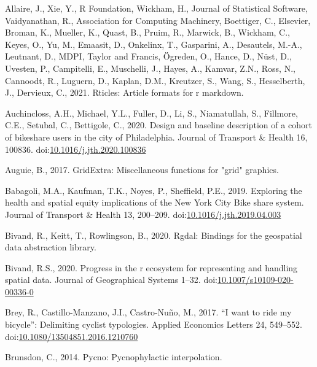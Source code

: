 \documentclass[]{elsarticle} %
\begin{document}
\hypertarget{refs}{}
\leavevmode\hypertarget{ref-R-rticles}{}%
Allaire, J., Xie, Y., R Foundation, Wickham, H., Journal of Statistical
Software, Vaidyanathan, R., Association for Computing Machinery,
Boettiger, C., Elsevier, Broman, K., Mueller, K., Quast, B., Pruim, R.,
Marwick, B., Wickham, C., Keyes, O., Yu, M., Emaasit, D., Onkelinx, T.,
Gasparini, A., Desautels, M.-A., Leutnant, D., MDPI, Taylor and Francis,
Ögreden, O., Hance, D., Nüst, D., Uvesten, P., Campitelli, E.,
Muschelli, J., Hayes, A., Kamvar, Z.N., Ross, N., Cannoodt, R., Luguern,
D., Kaplan, D.M., Kreutzer, S., Wang, S., Hesselberth, J., Dervieux, C.,
2021. Rticles: Article formats for r markdown.

\leavevmode\hypertarget{ref-auchinclossDesignBaselineDescription2020}{}%
Auchincloss, A.H., Michael, Y.L., Fuller, D., Li, S., Niamatullah, S.,
Fillmore, C.E., Setubal, C., Bettigole, C., 2020. Design and baseline
description of a cohort of bikeshare users in the city of Philadelphia.
Journal of Transport \& Health 16, 100836.
doi:\href{https://doi.org/10.1016/j.jth.2020.100836}{10.1016/j.jth.2020.100836}

\leavevmode\hypertarget{ref-R-gridExtra}{}%
Auguie, B., 2017. GridExtra: Miscellaneous functions for "grid"
graphics.

\leavevmode\hypertarget{ref-babagoliExploringHealthSpatial2019}{}%
Babagoli, M.A., Kaufman, T.K., Noyes, P., Sheffield, P.E., 2019.
Exploring the health and spatial equity implications of the New York
City Bike share system. Journal of Transport \& Health 13, 200--209.
doi:\href{https://doi.org/10.1016/j.jth.2019.04.003}{10.1016/j.jth.2019.04.003}

\leavevmode\hypertarget{ref-R-rgdal}{}%
Bivand, R., Keitt, T., Rowlingson, B., 2020. Rgdal: Bindings for the
geospatial data abstraction library.

\leavevmode\hypertarget{ref-bivand2020progress}{}%
Bivand, R.S., 2020. Progress in the r ecosystem for representing and
handling spatial data. Journal of Geographical Systems 1--32.
doi:\href{https://doi.org/10.1007/s10109-020-00336-0}{10.1007/s10109-020-00336-0}

\leavevmode\hypertarget{ref-breyWantRideMy2017}{}%
Brey, R., Castillo-Manzano, J.I., Castro-Nuño, M., 2017. ``I want to
ride my bicycle'': Delimiting cyclist typologies. Applied Economics
Letters 24, 549--552.
doi:\href{https://doi.org/10.1080/13504851.2016.1210760}{10.1080/13504851.2016.1210760}

\leavevmode\hypertarget{ref-R-pycno}{}%
Brunsdon, C., 2014. Pycno: Pycnophylactic interpolation.
\end{document}
